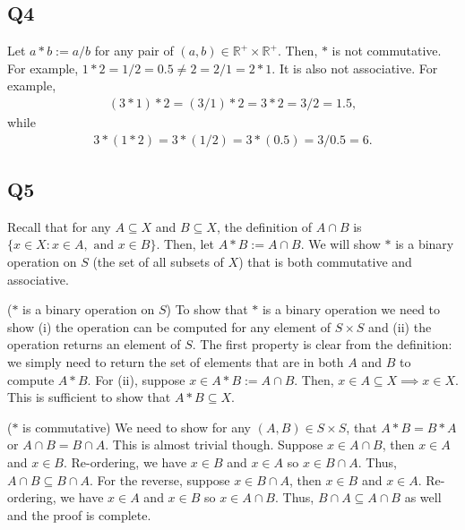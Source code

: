 \documentclass[12pt]{article}
\def\R{{\mathbb R}}        %
\numberwithin{theorem}{section}
\numberwithin{equation}{section}
\numberwithin{remark}{section}
\numberwithin{definition}{section}
\numberwithin{theorem}{section}
\numberwithin{lemma}{section}
\numberwithin{example}{section}
\begin{document}
\subsection{Q4}

Let $a*b:=a/b$ for any pair of $(a,b)\in\R^+\times\R^+$. Then, $*$ is not commutative. For example, $1*2=1/2=0.5\neq2=2/1=2*1$. It is also not associative. For example, 
\begin{align*}
	(3*1)*2=(3/1)*2=3*2=3/2=1.5,
\end{align*}
while
\begin{align*}
	3*(1*2)=3*(1/2)=3*(0.5)=3/0.5=6.
\end{align*}



\subsection{Q5}

Recall that for any $A\subseteq X$ and $B\subseteq X$, the definition of $A\cap B$ is $\{x\in X: x\in A,\text{ and } x\in B\}$. Then, let $A * B:= A \cap B$. We will show $*$ is a binary operation on $S$ (the set of all subsets of $X$) that is both commutative and associative. 

\vspace{\baselineskip}

\noindent ($*$ is a binary operation on $S$) To show that $*$ is a binary operation we need to show (i) the operation can be computed for any element of $S\times S$ and (ii) the operation returns an element of $S$. The first property is clear from the definition: we simply need to return the set of elements that are in both $A$ and $B$ to compute $A * B$. For (ii), suppose $x\in A * B := A \cap B$. Then, $x\in A \subseteq X \implies x \in X$. This is sufficient to show that $A * B \subseteq X$. 

\vspace{\baselineskip}

\noindent ($*$ is commutative) We need to show for any $(A,B)\in S\times S$, that $A * B = B * A$ or $A \cap B = B \cap A$. This is almost trivial though. Suppose $x\in A \cap B$, then $x \in A$ and $x \in B$. Re-ordering, we have $x\in B$ and $x \in A$ so $x \in B \cap A$. Thus, $A \cap B \subseteq B \cap A$. For the reverse, suppose $x \in B \cap A$, then $x \in B$ and $x \in A$. Re-ordering, we have $x \in A$ and $x\in B$ so $x \in A \cap B$. Thus, $B \cap A \subseteq A \cap B$ as well and the proof is complete. 
\end{document}
